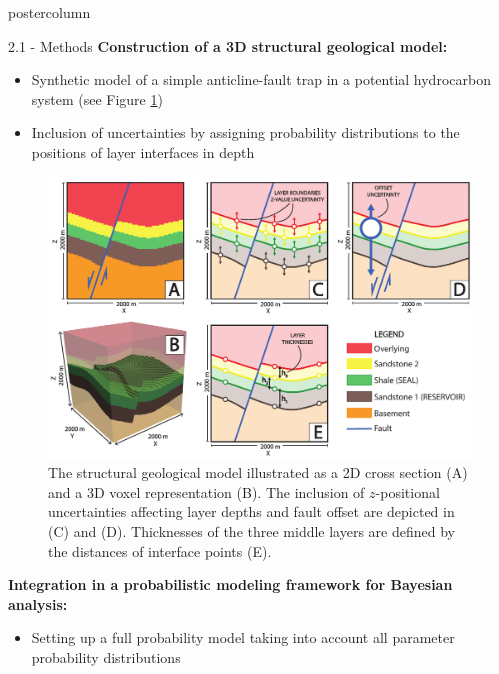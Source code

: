\documentclass{beamer}
\begin{document}
\begin{frame}
\begin{columns}
\begin{column}{.249\textwidth}
\begin{beamercolorbox}[center]{postercolumn}
\begin{minipage}{.98\textwidth}
{\begin{myblock}{2.1 - Methods}
\textbf{Construction of a 3D structural geological model:}
	\begin{itemize}
	\item Synthetic model of a simple anticline-fault trap in a potential hydrocarbon system (see Figure \ref{fig:unc_lik})
	\item Inclusion of uncertainties by assigning probability distributions to the positions of layer interfaces in depth
	\end{itemize}							
								\vspace{0.5em}
								\begin{figure}
									\begin{minipage}{0.95\textwidth}
										\centering\includegraphics[width=1\textwidth]{figures/Uncertainties_Likelihoods.pdf}
										\caption{The structural geological model illustrated as a 2D cross section (A) and a 3D voxel representation (B). The inclusion of $z$-positional uncertainties affecting layer depths and fault offset are depicted in (C) and (D). Thicknesses of the three middle layers are defined by the distances of interface points (E).}
										\label{fig:unc_lik}
									\end{minipage}
								\end{figure}
\textbf{Integration in a probabilistic modeling framework for Bayesian analysis:}
	\begin{itemize}
	\item Setting up a full probability model taking into account all parameter probability distributions

\end{itemize}
\end{myblock}}
\end{minipage}
\end{beamercolorbox}
\end{column}
\end{columns}
\end{frame}
\end{document}
